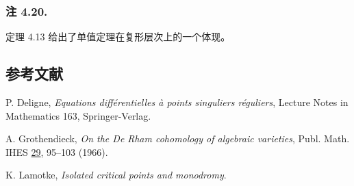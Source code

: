 \subsubsection*{注 4.20.}
定理 4.13 给出了单值定理在复形层次上的一个体现。

\subsection*{参考文献}

\begin{enumerate}[label={[\arabic*]},leftmargin=3em]
\item P. Deligne, \emph{Equations diff\'erentielles \`a points
  singuliers r\'eguliers}, Lecture Notes in Mathematics 163,
  Springer-Verlag.
\item A. Grothendieck, \emph{On the De Rham cohomology of algebraic
  varieties}, Publ. Math. IHES \underline{29}, 95--103 (1966).
\item K. Lamotke, \emph{Isolated critical points and monodromy}.
\end{enumerate}
